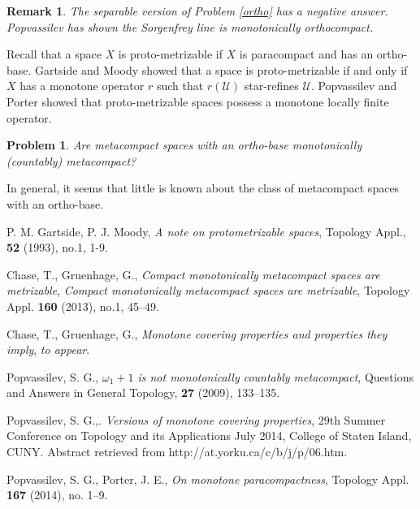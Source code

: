 \documentclass{amsart}
\newtheorem{problem}[theorem]{Problem}
\newtheorem{re}[theorem]{Remark}
\begin{document}
\begin{re}
The separable version of Problem \ref{ortho} has a negative answer. Popvassilev \cite{P1} has shown the Sorgenfrey line is monotonically orthocompact.
\end{re}

Recall that a space $X$ is proto-metrizable if $X$ is paracompact and has an ortho-base. Gartside and Moody \cite{GM} showed that a space is proto-metrizable if
and only if $X$ has a monotone operator $r$ such that $r(\mathcal{U})$ star-refines $\mathcal{U}$. Popvassilev and Porter \cite{PP} showed that proto-metrizable  spaces
possess a monotone locally finite operator.

\begin{problem}
Are metacompact spaces with an ortho-base monotonically (countably) metacompact?
\end{problem}

In general, it seems that little is known about the class of metacompact spaces with an ortho-base.

\begin{thebibliography}{AL}

 P. M. Gartside, P. J. Moody,
{\em A note on protometrizable spaces},
Topology Appl., {\bf 52} (1993), no.1, 1-9.

 Chase, T., Gruenhage, G., {\em Compact monotonically metacompact spaces are metrizable},
{\em Compact monotonically metacompact spaces are metrizable},
Topology Appl.
{\bf 160} (2013), no.1, 45--49.

 Chase, T., Gruenhage, G., {\em Monotone covering properties and properties they imply}, {\em to appear}.

 Popvassilev, S. G., {\em $\omega_1 + 1$ is not monotonically countably metacompact}, Questions and Answers
in General Topology, {\bf 27} (2009), 133--135.

 Popvassilev, S. G.,.  {\em Versions of monotone covering properties}, 29th Summer Conference on Topology and its Applications
July 2014, College of Staten Island, CUNY. Abstract retrieved from http://at.yorku.ca/c/b/j/p/06.htm.

 Popvassilev, S. G., Porter, J. E., {\em On monotone paracompactness}, Topology Appl.
{\bf 167} (2014), no. 1–9.

\end{thebibliography}
\end{document}
